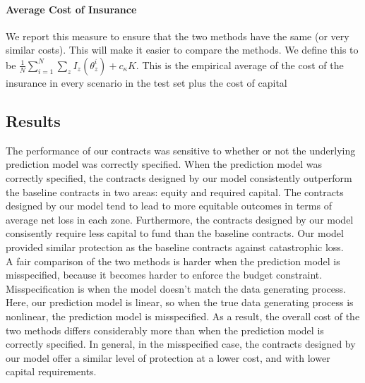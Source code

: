\documentclass[11pt]{article}
\begin{document}
    \paragraph*{Average Cost of Insurance} We report this measure to ensure that the two methods have the same (or very similar costs). This will make it easier to compare the methods. We define this to be $\frac{1}{N}\sum_{i=1}^N \sum_z I_z(\theta^i_z) + c_{\kappa} K$. This is the empirical average of the cost of the insurance in every scenario in the test set plus the cost of capital

  \subsection{Results}
  The performance of our contracts was sensitive to whether or not the underlying prediction model was correctly specified. When the prediction model was correctly specified, the contracts designed by our model consistently outperform the baseline contracts in two areas: equity and required capital. The contracts designed by our model tend to lead to more equitable outcomes in terms of average net loss in each zone. Furthermore, the contracts designed by our model consisently require less capital to fund than the baseline contracts. Our model provided similar protection as the baseline contracts against catastrophic loss. \\
  A fair comparison of the two methods is harder when the prediction model is misspecified, because it becomes harder to enforce the budget constraint. Misspecification is when the model doesn't match the data generating process. Here, our prediction model is linear, so when the true data generating process is nonlinear, the prediction model is misspecified. As a result, the overall cost of the two methods differs considerably more than when the prediction model is correctly specified. In general, in the misspecified case, the contracts designed by our model offer a similar level of protection at a lower cost, and with lower capital requirements.  
\end{document}
